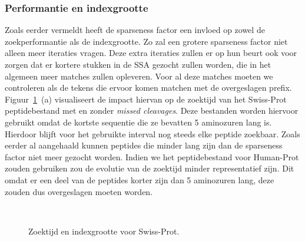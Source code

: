 \subsubsection{Performantie en indexgrootte}
Zoals eerder vermeldt heeft de sparseness factor een invloed op zowel de zoekperformantie als de indexgrootte.
Zo zal een grotere sparseness factor niet alleen meer iteraties vragen.
Deze extra iteraties zullen er op hun beurt ook voor zorgen dat er kortere stukken in de SSA gezocht zullen worden, die in het algemeen meer matches zullen opleveren.
Voor al deze matches moeten we controleren als de tekens die ervoor komen matchen met de overgeslagen prefix.
Figuur~\ref{fig:search_sparseness}~(a) visualiseert de impact hiervan op de zoektijd van het Swiss-Prot peptidebestand met en zonder \textit{missed cleavages}.
Deze bestanden worden hiervoor gebruikt omdat de kortste sequentie die ze bevatten 5 aminozuren lang is.
Hierdoor blijft voor het gebruikte interval nog steeds elke peptide zoekbaar.
Zoals eerder al aangehaald kunnen peptides die minder lang zijn dan de sparseness factor niet meer gezocht worden.
Indien we het peptidebestand voor Human-Prot zouden gebruiken zou de evolutie van de zoektijd minder representatief zijn.
Dit omdat er een deel van de peptides korter zijn dan 5 aminozuren lang, deze zouden dus overgeslagen moeten worden.
\\
\begin{figure}[H]
    \centering
    \\[4ex] %

    \caption{Zoektijd en indexgrootte voor Swiss-Prot.}\label{fig:search_sparseness}
\end{figure}

